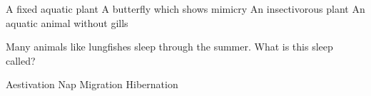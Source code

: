 \begin{questions}
    \begin{randomizechoices}
        \CorrectChoice A fixed aquatic plant
        \choice A butterfly which shows mimicry
        \choice An insectivorous plant
        \choice An aquatic animal without gills
    \end{randomizechoices}

    \question Many animals like lungfishes sleep through the summer. What is this sleep called?

    \begin{randomizeoneparchoices}
        \CorrectChoice Aestivation
        \choice Nap
        \choice Migration
        \choice Hibernation
    \end{randomizeoneparchoices}

\end{questions}

